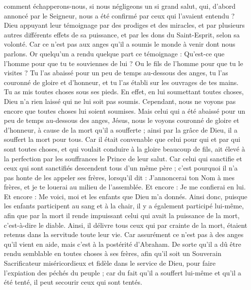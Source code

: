 \begin{multicols}{2}
comment échapperons-nous, si nous négligeons un si grand salut, qui, d’abord annoncé par le Seigneur, nous a été confirmé par ceux qui l'avaient entendu ?
Dieu appuyant leur témoignage par des prodiges et des miracles, et par plusieurs autres différents effets de sa puissance, et par les dons du Saint-Esprit, selon sa volonté.
Car ce n'est pas aux anges qu'il a soumis le monde à venir dont nous parlons.
Or quelqu'un a rendu quelque part ce témoignage : Qu'est-ce que l'homme pour que tu te souviennes de lui ? Ou le fils de l'homme pour que tu le visites ?
Tu l'as abaissé pour un peu de temps au-dessous des anges, tu l'as couronné de gloire et d'honneur, et tu l'as établi sur les ouvrages de tes mains.
Tu as mis toutes choses sous ses pieds. En effet, en lui soumettant toutes choses, Dieu n'a rien laissé qui ne lui soit pas soumis. Cependant, nous ne voyons pas encore que toutes choses lui soient soumises.
Mais celui qui a été abaissé pour un peu de temps au-dessous des anges, Jésus, nous le voyons couronné de gloire et d'honneur, à cause de la mort qu’il a soufferte ; ainsi par la grâce de Dieu, il a souffert la mort pour tous.
Car il était convenable que celui pour qui et par qui sont toutes choses, et qui voulait conduire à la gloire beaucoup de fils, ait élevé à la perfection par les souffrances le Prince de leur salut.
Car celui qui sanctifie et ceux qui sont sanctifiés descendent tous d'un même père ; c'est pourquoi il n’a pas honte de les appeler ses frères,
lorsqu’il dit : J'annoncerai ton Nom à mes frères, et je te louerai au milieu de l'assemblée.
Et encore : Je me confierai en lui. Et encore : Me voici, moi et les enfants que Dieu m'a donnés.
Ainsi donc, puisque les enfants participent au sang et à la chair, il y a également participé lui-même, afin que par la mort il rende impuissant celui qui avait la puissance de la mort, c'est-à-dire le diable.
Ainsi, il délivre tous ceux qui par crainte de la mort, étaient retenus dans la servitude toute leur vie.
Car assurément ce n’est pas à des anges qu’il vient en aide, mais c’est à la postérité d'Abraham.
De sorte qu’il a dû être rendu semblable en toutes choses à ses frères, afin qu'il soit un Souverain Sacrificateur miséricordieux et fidèle dans le service de Dieu, pour faire l’expiation des péchés du peuple ;
car du fait qu'il a souffert lui-même et qu’il a été tenté, il peut secourir ceux qui sont tentés.

\end{multicols}
